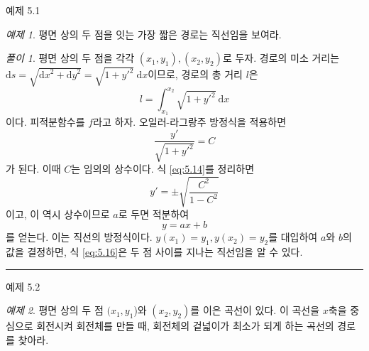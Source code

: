 \documentclass[chapter, oneside, b5paper]{oblivoir}
\theoremstyle{plain}
\theoremstyle{definition}
\theoremstyle{remark}
\newtheorem{example}{예제}[chapter]    %
\newtheorem*{solution}{풀이}
\begin{document}
\begin{examplebox}{예제 5.1}
\begin{example}
평면 상의 두 점을 잇는 가장 짧은 경로는 직선임을 보여라.
\end{example}
\end{examplebox}

\begin{solution}
    평면 상의 두 점을 각각 $(x_1, y_1), (x_2, y_2)$로 두자. 경로의 미소 거리는 $\textrm{d}s = \sqrt{{\mathrm{d}x}^2 + {\mathrm{d}y}^2} = \sqrt{1 + {y'}^2} \ \mathrm{d}x$이므로, 경로의 총 거리 $l$은
    \begin{equation}
        l = \int_{x_1}^{x_2} \sqrt{1 + {y'}^2} \ \mathrm{d}x
    \end{equation}
    이다. 피적분함수를 $f$라고 하자. 오일러-라그랑주 방정식을 적용하면
    \begin{equation}
        \frac{y'}{\sqrt{1 + {y'}^2}} = C
        \label{eq:5.14}
    \end{equation}
    가 된다. 이때 $C$는 임의의 상수이다. 식 \ref{eq:5.14}를 정리하면
    \begin{equation}
        y' = \pm\sqrt{\frac{C^2}{1-C^2}}
    \end{equation}
    이고, 이 역시 상수이므로 $a$로 두면 적분하여
    \begin{equation}
        y = ax+b
        \label{eq:5.16}
    \end{equation}
    를 얻는다. 이는 직선의 방정식이다. $y(x_1) = y_1, y(x_2) = y_2$를 대입하여 $a$와 $b$의 값을 결정하면, 식 \ref{eq:5.16}은 두 점 사이를 지나는 직선임을 알 수 있다.
\end{solution}

\noindent\rule{\textwidth}{0.8pt} %
\vspace{1em} %

\begin{examplebox}{예제 5.2}
\begin{example}
평면 상의 두 점 $(x_1, y_1$)와 $(x_2, y_2)$를 이은 곡선이 있다. 이 곡선을 $x$축을 중심으로 회전시켜 회전체를 만들 때, 회전체의 겉넓이가 최소가 되게 하는 곡선의 경로를 찾아라.
\end{example}
\end{examplebox}
\end{document}
